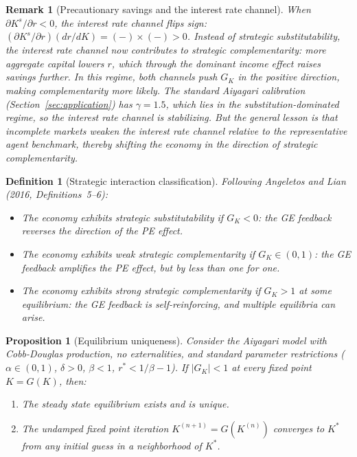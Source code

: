 \documentclass[12pt]{article}
\newtheorem{definition}{Definition}
\newtheorem{proposition}{Proposition}
\newtheorem{remark}{Remark}
\begin{document}
\begin{remark}[Precautionary savings and the interest rate channel]
When $\partial K^s / \partial r < 0$, the interest rate channel \emph{flips sign}: $(\partial K^s / \partial r)(dr/dK) = (-)\times(-) > 0$. Instead of strategic substitutability, the interest rate channel now contributes to strategic \emph{complementarity}: more aggregate capital lowers $r$, which through the dominant income effect raises savings further. In this regime, both channels push $G_K$ in the positive direction, making complementarity more likely. The standard Aiyagari calibration (Section~\ref{sec:application}) has $\gamma = 1.5$, which lies in the substitution-dominated regime, so the interest rate channel is stabilizing. But the general lesson is that incomplete markets weaken the interest rate channel relative to the representative agent benchmark, thereby shifting the economy in the direction of strategic complementarity.
\end{remark}

\begin{definition}[Strategic interaction classification]
\label{def:strategic_types}
Following Angeletos and Lian (2016, Definitions~5--6):
\begin{itemize}[nosep]
    \item The economy exhibits \emph{strategic substitutability} if $G_K < 0$: the GE feedback reverses the direction of the PE effect.
    \item The economy exhibits \emph{weak strategic complementarity} if $G_K \in (0,1)$: the GE feedback amplifies the PE effect, but by less than one for one.
    \item The economy exhibits \emph{strong strategic complementarity} if $G_K > 1$ at some equilibrium: the GE feedback is self-reinforcing, and multiple equilibria can arise.
\end{itemize}
\end{definition}

\begin{proposition}[Equilibrium uniqueness]
\label{prop:uniqueness}
Consider the Aiyagari model with Cobb-Douglas production, no externalities, and standard parameter restrictions ($\alpha \in (0,1)$, $\delta > 0$, $\beta < 1$, $r^* < 1/\beta - 1$). If $|G_K| < 1$ at every fixed point $K = G(K)$, then:
\begin{enumerate}[label=(\roman*)]
    \item The steady state equilibrium exists and is unique.
    \item The undamped fixed point iteration $K^{(n+1)} = G(K^{(n)})$ converges to $K^*$ from any initial guess in a neighborhood of $K^*$.
\end{enumerate}
\end{proposition}
\end{document}
